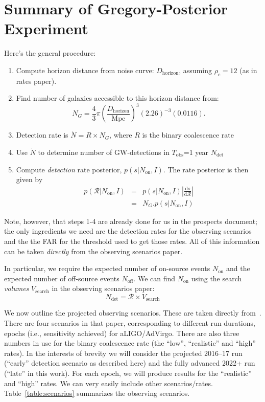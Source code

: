 \documentclass[twocolumn,nofootinbib]{revtex4-1}
\newcommand{\cbcrate}{{{\mathcal R}}}
\newcommand{\diff}{{\mathrm d}}
\begin{document}
\section{Summary of Gregory-Posterior Experiment}
Here's the general procedure:
\begin{enumerate}
\item Compute horizon distance from noise curve: $D_{\mathrm{horizon}}$,
assuming $\rho_c=12$ (as in rates paper).
\item Find number of galaxies accessible to this horizon distance from:
\begin{equation}
N_G = \frac{4}{3} \pi \left( \frac{D_{\textrm{horizon}}}{\textrm{Mpc}}
\right)^3 (2.26)^{-3} (0.0116).
\end{equation}
\item Detection rate is $\dot{N} = R \times N_G$, where $R$ is the binary
coalescence rate
\item Use $\dot{N}$ to determine number of GW-detections in $T_{\mathrm{obs}}$=1 year
$N_{\mathrm{det}}$
\item Compute \emph{detection} rate posterior, $p(s|N_{\textrm{on}},I)$.  The
rate posterior is then given by 
\begin{eqnarray}
p(\cbcrate|N_{\textrm{on}},I) & = & p(s|N_{\textrm{on}},I) \left|\frac{\diff
s}{\diff \cbcrate}\right| \\
& = & N_G . p(s|N_{\textrm{on}},I)
\end{eqnarray}
\end{enumerate}
%
Note, however, that steps 1-4 are already done for us in the prospects document;
the only ingredients we need are the detection rates for the observing scenarios
and the the FAR for the threshold used to get those rates.  All of this
information can be taken \emph{directly} from the observing scenarios paper.

In particular, we require the expected number of on-source events
$N_{\mathrm{on}}$ and the expected number of off-source events
$N_{\mathrm{off}}$.  We can find $N_{\mathrm{on}}$ using the search
\emph{volumes} $V_{\mathrm{search}}$ in the observing scenarios paper:
%
\begin{equation}
N_{\mathrm{det}} = \cbcrate \times V_{\mathrm{search}}
\end{equation}

We now outline the projected observing scenarios.  These are taken directly
from~\cite{ade_prospects}.  There are four scenarios in that paper,
corresponding to different run durations, epochs (i.e., sensitivity achieved)
for aLIGO/AdVirgo.  There are also three numbers in use for the binary
coalescence rate (the ``low'', ``realistic'' and ``high'' rates).  In the
interests of brevity we will consider the projected 2016--17 run (``early''
detection scenario as described here) and the fully advanced 2022+ run (``late''
in this work).  For each epoch, we will produce results for the ``realistic''
and ``high'' rates.   We can very easily include other scenarios/rates.
Table~\ref{table:scenarios} summarizes the observing scenarios.
\end{document}
